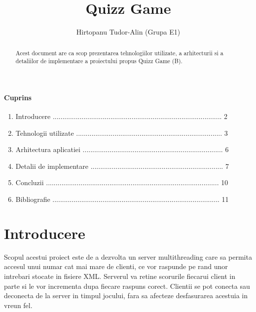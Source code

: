 \documentclass[runningheads]{llncs}
\begin{document}
\title{Quizz Game}
\author{Hirtopanu Tudor-Alin (Grupa E1)}
\maketitle

\begin{abstract}
Acest document are ca scop prezentarea tehnologiilor utilizate, a arhitecturii si a detaliilor de implementare a proiectului propus Quizz Game (B).
\end{abstract}
\vskip 2cm

\paragraph{\textbf {\large {Cuprins}}}
\begin{enumerate}
\item Introducere	........................................................................................	2
\item Tehnologii utilizate	............................................................................	3
\item Arhitectura aplicatiei	......................................................................... 6
\item Detalii de implementare	..................................................................... 7
\item Concluzii	..........................................................................................	10
\item Bibliografie	.......................................................................................	11
\end{enumerate}
\newpage

\section{Introducere}
Scopul acestui proiect este de a dezvolta un server multithreading care sa permita accesul unui numar cat mai mare de clienti, ce vor raspunde pe rand unor intrebari stocate in fisiere XML. Serverul va retine scorurile fiecarui client in parte si le vor incrementa dupa fiecare raspuns corect. Clientii se pot conecta sau deconecta de la server in timpul jocului, fara sa afecteze desfasurarea acestuia in vreun fel.
\end{document}
